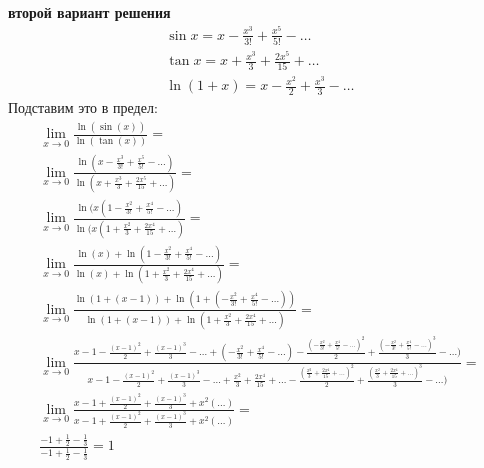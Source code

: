 \begin{enumerate}
			\textbf{второй вариант решения}\\
			\begin{gather*}
				\sin x = x - \frac{x^{3}}{3!} + \frac{x^{5}}{5!} - \ldots\\
				\tan x = x + \frac{x^{3}}{3} + \frac{2x^{5}}{15} + \ldots\\
				\ln(1 + x) = x - \frac{x^{2}}{2} + \frac{x^{3}}{3} - \ldots
			\end{gather*}
			Подставим это в предел:\\
			\begin{gather*}
				\lim\limits_{x \to 0}\frac{\ln(\sin(x))}{\ln(\tan(x))} = \\ 
				\lim\limits_{x \to 0}\frac{\ln(x - \frac{x^{3}}{3!} + \frac{x^{5}}{5!} - \ldots)}{\ln(x + \frac{x^{3}}{3} + \frac{2x^{5}}{15} + \ldots)} = \\ 
				\lim\limits_{x \to 0}\frac{\ln(x(1 - \frac{x^{2}}{3!} + \frac{x^{4}}{5!} - \ldots)}{\ln(x(1 + \frac{x^{2}}{3} + \frac{2x^{4}}{15} + \ldots)} = \\ 
				\lim\limits_{x \to 0}\frac{\ln(x) + \ln(1 - \frac{x^{2}}{3!} + \frac{x^{4}}{5!} - \ldots)}{\ln(x) + \ln(1 + \frac{x^{2}}{3} + \frac{2x^{4}}{15} + \ldots)} = \\ 
				\lim\limits_{x \to 0}\frac{\ln(1 + (x - 1)) + \ln(1 + ( - \frac{x^{2}}{3!} + \frac{x^{4}}{5!} - \ldots))}{\ln(1 + (x - 1)) + \ln(1 + \frac{x^{2}}{3} + \frac{2x^{4}}{15} + \ldots)} = \\ 
				\lim\limits_{x \to 0}\frac{x - 1 - \frac{(x - 1)^{2}}{2} + \frac{(x - 1)^{3}}{3} - \ldots + ( - \frac{x^{2}}{3!} + \frac{x^{4}}{5!} - \ldots) - \frac{( - \frac{x^{2}}{3!} + \frac{x^{4}}{5!} - \ldots)^{2}}{2} + \frac{( - \frac{x^{2}}{3!} + \frac{x^{4}}{5!} - \ldots)^{3}}{3} - \ldots)}{x - 1 - \frac{(x - 1)^{2}}{2} + \frac{(x - 1)^{3}}{3} - \ldots + \frac{x^{2}}{3} + \frac{2x^{4}}{15} + \ldots - \frac{(\frac{x^{2}}{3} + \frac{2x^{4}}{15} + \ldots)^{2}}{2} + \frac{(\frac{x^{2}}{3} + \frac{2x^{4}}{15} + \ldots)^{3}}{3} - \ldots)} = \\ 
				\lim\limits_{x \to 0}\frac{x - 1 + \frac{(x - 1)^{2}}{2} + \frac{(x - 1)^{3}}{3} + x^2(\ldots)}{x - 1 + \frac{(x - 1)^{2}}{2} + \frac{(x - 1)^{3}}{3} + x^2(\ldots)} = \\ 
				\frac{ - 1 + \frac{1}{2} - \frac{1}{3}}{ - 1 + \frac{1}{2} - \frac{1}{3}} = 1
			\end{gather*}
		\end{enumerate}
		

